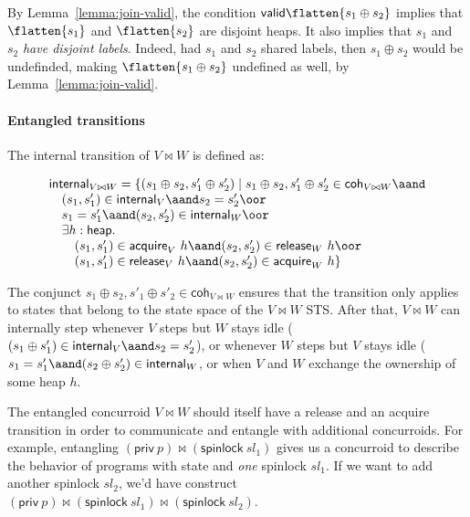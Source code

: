 By Lemma~\ref{lemma:join-valid}, the condition $\mathsf{valid}
\flatten {s_1 \oplus s_2}$ implies that $\flatten{s_1}$ and
$\flatten{s_2}$ are disjoint heaps. It also implies that $s_1$ and
$s_2$ \emph{have disjoint labels}. Indeed, had $s_1$ and $s_2$ shared
labels, then $s_1 \oplus s_2$ would be undefinded, making $\flatten
{s_1 \oplus s_2}$ undefined as well, by Lemma~\ref{lemma:join-valid}.

\paragraph{Entangled transitions}

The internal transition of $V \bowtie W$ is defined as:

\[
\begin{array}{l}
\mathsf{internal}_{V \bowtie W} = \{(s_1 \oplus s_2, s'_1 \oplus s'_2) \mid s_1 \oplus s_2, s'_1 \oplus s'_2 \in \mathsf{coh}_{V\bowtie W} \aand \hbox{}\\
\quad\!\!\!\begin{array}[t]{l}
  (s_1, s'_1) \in \mathsf{internal}_V \aand s_2 = s'_2  \oor \hbox{}\\
  s_1 = s'_1 \aand (s_2, s'_2) \in \mathsf{internal}_W \oor \hbox{}\\
  \exists h : \mathsf{heap}. \hbox{}\\
  \quad  (s_1, s'_1) \in \mathsf{acquire}_V\ h \aand (s_2, s'_2) \in \mathsf{release}_W\ h \oor \hbox{}\\
  \quad  (s_1, s'_1) \in \mathsf{release}_V\ h \aand (s_2, s'_2) \in \mathsf{acquire}_W\ h \}
  \end{array}
\end{array}
\]

The conjunct $s_1 \oplus s_2, s'_1 \oplus s'_2 \in
\mathsf{coh}_{V\bowtie W}$ ensures that the transition only applies to
states that belong to the state space of the $V \bowtie W$ STS.  After
that, $V \bowtie W$ can internally step whenever $V$ steps but $W$
stays idle ($(s_1 \oplus s'_1) \in \mathsf{internal}_V \aand s_2 =
s'_2$), or whenever $W$ steps but $V$ stays idle ($s_1 = s'_1 \aand
(s_2 \oplus s'_2) \in \mathsf{internal}_W$, or when $V$ and $W$
exchange the ownership of some heap $h$.


The entangled concurroid $V \bowtie W$ should itself have a release
and an acquire transition in order to communicate and entangle with
additional concurroids. For example, entangling $(\mathsf{priv}\ p)
\bowtie (\mathsf{spinlock}\ sl_1)$ gives us a concurroid to describe
the behavior of programs with state and \emph{one} spinlock $sl_1$. If
we want to add another spinlock $sl_2$, we'd have construct
$(\mathsf{priv}\ p) \bowtie (\mathsf{spinlock}\ sl_1) \bowtie
(\mathsf{spinlock}\ sl_2)$.

